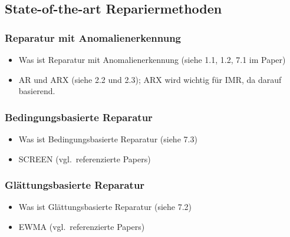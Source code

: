 \subsection{State-of-the-art Repariermethoden}
\subsubsection{Reparatur mit Anomalienerkennung}\label{sec:anomalienerkennung}
    \begin{itemize}
        \item Was ist Reparatur mit Anomalienerkennung (siehe 1.1, 1.2, 7.1 im Paper) 
        \item AR und ARX (siehe 2.2 und 2.3); ARX wird wichtig für IMR, da darauf basierend.
    \end{itemize}
\subsubsection{Bedingungsbasierte Reparatur}

    \begin{itemize}
        \item Was ist Bedingungsbasierte Reparatur (siehe 7.3)
        \item SCREEN (vgl.\ referenzierte Papers) 
    \end{itemize}

\subsubsection{Glättungsbasierte Reparatur}

    \begin{itemize}
        \item Was ist Glättungsbasierte Reparatur (siehe 7.2)
        \item EWMA (vgl.\ referenzierte Papers) 
    \end{itemize}

